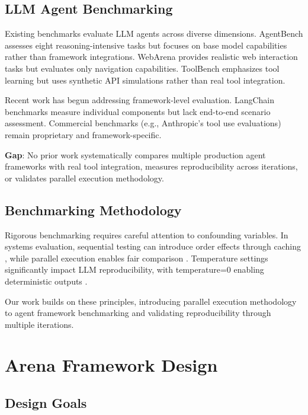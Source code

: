 \documentclass[sigconf,nonacm]{acmart}
\begin{document}
\subsection{LLM Agent Benchmarking}

Existing benchmarks evaluate LLM agents across diverse dimensions. AgentBench \cite{liu2023agentbench} assesses eight reasoning-intensive tasks but focuses on base model capabilities rather than framework integrations. WebArena \cite{zhou2023webarena} provides realistic web interaction tasks but evaluates only navigation capabilities. ToolBench \cite{qin2023toolllm} emphasizes tool learning but uses synthetic API simulations rather than real tool integration.

Recent work has begun addressing framework-level evaluation. LangChain benchmarks \cite{langchain2023} measure individual components but lack end-to-end scenario assessment. Commercial benchmarks (e.g., Anthropic's tool use evaluations) remain proprietary and framework-specific.

\textbf{Gap}: No prior work systematically compares multiple production agent frameworks with real tool integration, measures reproducibility across iterations, or validates parallel execution methodology.

\subsection{Benchmarking Methodology}

Rigorous benchmarking requires careful attention to confounding variables. In systems evaluation, sequential testing can introduce order effects through caching \cite{mytkowicz2009producing}, while parallel execution enables fair comparison \cite{hoefler2015scientific}. Temperature settings significantly impact LLM reproducibility, with temperature=0 enabling deterministic outputs \cite{ouyang2023llm}.

Our work builds on these principles, introducing parallel execution methodology to agent framework benchmarking and validating reproducibility through multiple iterations.

\section{Arena Framework Design}

\subsection{Design Goals}
\end{document}
